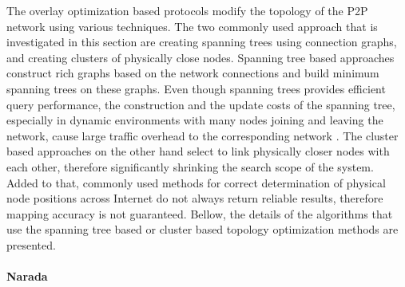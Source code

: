The overlay optimization based protocols modify the topology of the P2P network
using various techniques. The two commonly used approach that is investigated in
this section are creating spanning trees using connection graphs, and creating
clusters of physically close nodes. Spanning tree based approaches construct
rich graphs based on the network connections and build minimum spanning trees on
these graphs. Even though spanning trees provides efficient query performance,
the construction and the update costs of the spanning tree, especially in
dynamic environments with many nodes joining and leaving the network, cause
large traffic overhead to the corresponding
network \cite{chu_esm_2000,chu_esm_2002}. The cluster based approaches on the
other hand select to link physically closer nodes with each other, therefore
significantly shrinking the search scope of the system. Added to that, commonly
used methods for correct determination of physical node positions across
Internet do not always return reliable results, therefore mapping accuracy is
not guaranteed. Bellow, the details of the algorithms that use the spanning tree
based or cluster based topology optimization methods are presented.

\paragraph*{\bf Narada}

